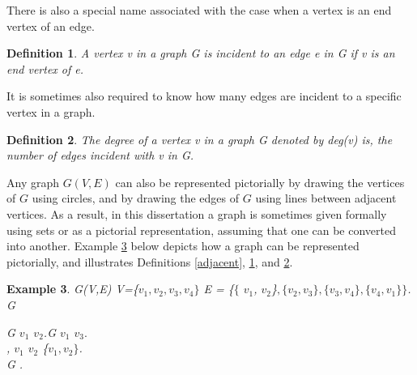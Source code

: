 \documentclass[12pt]{article}
\newtheorem{definition}{Definition}[subsection]
\newtheorem{example}[definition]{Example}
\numberwithin{equation}{subsection}
\numberwithin{table}{subsection}
\numberwithin{algorithm}{subsection}
\begin{document}
There is also a special name associated with the case when a vertex is an end vertex of an edge.
\begin{definition}
\label{incident}
A vertex v in a graph G is incident to an edge e in G if v is an end vertex of e. {}
\end{definition}
It is sometimes also required to know how many edges are incident to a specific vertex in a graph.
\begin{definition}
\label{degree}
The degree of a vertex v in a graph G denoted by deg(v) is, the number of edges incident with v in G. {}
\end{definition}
Any graph $\mathit{G(V,E)}$ can also be represented pictorially by drawing the vertices of $\mathit{G}$ using circles, and by drawing the edges of $\mathit{G}$ using lines between adjacent vertices. As a result, in this dissertation a graph is sometimes given formally using sets or as a pictorial representation, assuming that one can be converted into another. Example \ref{Example 1} below depicts how a graph can be represented pictorially, and illustrates Definitions  \ref{adjacent}, \ref{incident}, and \ref{degree}.
\begin{example}
\label{Example 1}
{} G(V,E) {}  V=\{$v_1, v_2, v_3, v_4\}$ {} E = \{$\{$ $v_1$, $v_2$\}$, \{v_2,v_3\}, \{v_3,v_4\}, \{v_4,v_1\}\}$.\\{} G {}\\
\begin{center}
\end{center}
{}G {} $v_1$ {} $v_2$.{}G {} $v_1$ {} $v_3.$\\ {}, $v_1$ {} $v_2$ {} \{$v_1, v_2\}$.\\
{} G {}.
\end{example}
\end{document}
